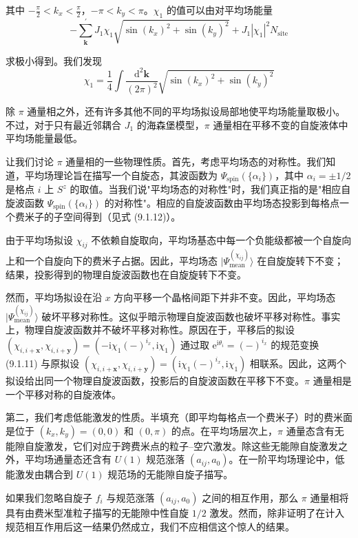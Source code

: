 其中 $-\frac{\pi}{2}<k_x<\frac{\pi}{2}$，$-\pi<k_y<\pi$。$\chi_1$ 的值可以由对平均场能量
\begin{equation*}
-\sum_{\pmb{k}}^{\prime}J_1\chi_1\sqrt{\sin(k_x)^{2}+\sin(k_y)^{2}}+J_1|\chi_1|^{2}N_{\text{site}}
\end{equation*}

求极小得到。我们发现
\begin{equation*}
\chi_1=\frac{1}{4}\int\frac{\mathrm{d}^{2}\pmb{k}}{(2\pi)^{2}}\sqrt{\sin(k_x)^{2}+\sin(k_y)^{2}}
\end{equation*}

除 $\pi$ 通量相之外，还有许多其他不同的平均场拟设局部地使平均场能量取极小。不过，对于只有最近邻耦合 $J_1$ 的海森堡模型，$\pi$ 通量相在平移不变的自旋液体中平均场能量最低。

让我们讨论 $\pi$ 通量相的一些物理性质。首先，考虑平均场态的对称性。我们知道，平均场理论旨在描写一个自旋态，其波函数为 $\Psi_{\text{spin}}(\{\alpha_i\})$，其中 $\alpha_i=\pm 1/2$ 是格点 $i$ 上 $S^{z}$ 的取值。当我们说"平均场态的对称性"时，我们真正指的是"相应自旋波函数 $\Psi_{\text{spin}}(\{\alpha_i\})$ 的对称性"。相应的自旋波函数由平均场态投影到每格点一个费米子的子空间得到（见式 (9.1.12)）。

由于平均场拟设 $\chi_{ij}$ 不依赖自旋取向，平均场基态中每一个负能级都被一个自旋向上和一个自旋向下的费米子占据。因此，平均场态 $|\Psi^{(\chi_{ij})}_{\text{mean}}\rangle$ 在自旋旋转下不变；结果，投影得到的物理自旋波函数也在自旋旋转下不变。

然而，平均场拟设在沿 $x$ 方向平移一个晶格间距下并非不变。因此，平均场态 $|\Psi^{(\chi_{ij})}_{\text{mean}}\rangle$ 破坏平移对称性。这似乎暗示物理自旋波函数也破坏平移对称性。事实上，物理自旋波函数并不破坏平移对称性。原因在于，平移后的拟设 $(\chi_{i,i+\pmb{x}},\chi_{i,i+\pmb{y}})=(-\mathrm{i}\chi_1(-)^{i_x},\mathrm{i}\chi_1)$ 通过取 $\mathrm{e}^{\mathrm{i}\theta_i}=(-)^{i_x}$ 的规范变换 (9.1.11) 与原拟设 $(\chi_{i,i+\pmb{x}},\chi_{i,i+\pmb{y}})=(\mathrm{i}\chi_1(-)^{i_x},\mathrm{i}\chi_1)$ 相联系。因此，这两个拟设给出同一个物理自旋波函数，投影后的自旋波函数在平移下不变。$\pi$ 通量相是一个平移对称的自旋液体。

第二，我们考虑低能激发的性质。半填充（即平均每格点一个费米子）时的费米面是位于 $(k_x,k_y)=(0,0)$ 和 $(0,\pi)$ 的点。在平均场层次上，$\pi$ 通量态含有无能隙自旋激发，它们对应于跨费米点的粒子–空穴激发。除这些无能隙自旋激发之外，平均场通量态还含有 $U(1)$ 规范涨落 $(a_{ij},a_0)$。在一阶平均场理论中，低能激发由耦合到 $U(1)$ 规范场的无能隙自旋子描写。

如果我们忽略自旋子 $f_i$ 与规范涨落 $(a_{ij},a_0)$ 之间的相互作用，那么 $\pi$ 通量相将具有由费米型准粒子描写的无能隙中性自旋 $1/2$ 激发。然而，除非证明了在计入规范相互作用后这一结果仍然成立，我们不应相信这个惊人的结果。

